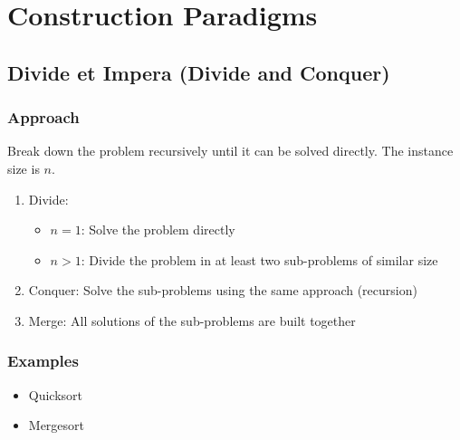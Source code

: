 \section{Construction Paradigms}
\subsection{Divide et Impera (Divide and Conquer)}
  \subsubsection{Approach}
    Break down the problem recursively until it can be solved directly. The instance size is $n$.
    
    \begin{enumerate}
      \item Divide: 
        \begin{itemize}
          \item $n = 1$: Solve the problem directly
          \item $n > 1$: Divide the problem in at least two sub-problems of similar size
        \end{itemize}
      \item Conquer: Solve the sub-problems using the same approach (recursion)
      \item Merge: All solutions of the sub-problems are built together
    \end{enumerate}
    
   \subsubsection{Examples}
     \begin{itemize}
       \item Quicksort
       \item Mergesort
     \end{itemize}
